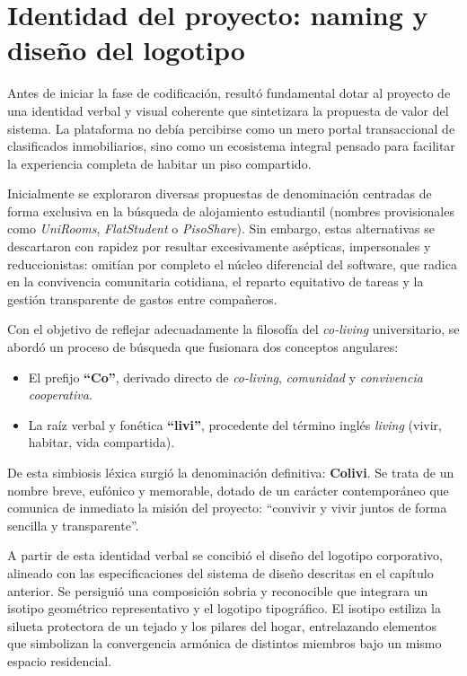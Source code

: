 \section{Identidad del proyecto: naming y diseño del logotipo}
\label{sec:identidad_proyecto}

Antes de iniciar la fase de codificación, resultó fundamental dotar al proyecto de una identidad verbal y visual coherente que sintetizara la propuesta de valor del sistema. La plataforma no debía percibirse como un mero portal transaccional de clasificados inmobiliarios, sino como un ecosistema integral pensado para facilitar la experiencia completa de habitar un piso compartido.

Inicialmente se exploraron diversas propuestas de denominación centradas de forma exclusiva en la búsqueda de alojamiento estudiantil (nombres provisionales como \emph{UniRooms}, \emph{FlatStudent} o \emph{PisoShare}). Sin embargo, estas alternativas se descartaron con rapidez por resultar excesivamente asépticas, impersonales y reduccionistas: omitían por completo el núcleo diferencial del software, que radica en la convivencia comunitaria cotidiana, el reparto equitativo de tareas y la gestión transparente de gastos entre compañeros.

Con el objetivo de reflejar adecuadamente la filosofía del \emph{co-living} universitario, se abordó un proceso de búsqueda que fusionara dos conceptos angulares:
\begin{itemize}
    \item El prefijo \textbf{``Co''}, derivado directo de \emph{co-living}, \emph{comunidad} y \emph{convivencia cooperativa}.
    \item La raíz verbal y fonética \textbf{``livi''}, procedente del término inglés \emph{living} (vivir, habitar, vida compartida).
\end{itemize}

De esta simbiosis léxica surgió la denominación definitiva: \textbf{Colivi}. Se trata de un nombre breve, eufónico y memorable, dotado de un carácter contemporáneo que comunica de inmediato la misión del proyecto: ``convivir y vivir juntos de forma sencilla y transparente''.

A partir de esta identidad verbal se concibió el diseño del logotipo corporativo, alineado con las especificaciones del sistema de diseño descritas en el capítulo anterior. Se persiguió una composición sobria y reconocible que integrara un isotipo geométrico representativo y el logotipo tipográfico. El isotipo estiliza la silueta protectora de un tejado y los pilares del hogar, entrelazando elementos que simbolizan la convergencia armónica de distintos miembros bajo un mismo espacio residencial. 

